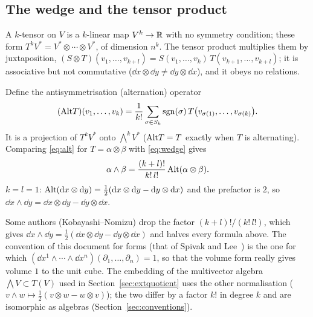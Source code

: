 \subsection{The wedge and the tensor product}\label{sec:wedgetensor}

A $k$-tensor on $V$ is a $k$-linear map $V^k\to\mathbb{R}$ with no symmetry condition; these form $T^kV^*=V^*\otimes\cdots\otimes V^*$, of dimension
$n^k$. The tensor product multiplies them by juxtaposition, $(S\otimes T)(v_1,\dots,v_{k+l})=S(v_1,\dots,v_k)\,T(v_{k+1},\dots,v_{k+l})$;
it is associative but not commutative ($\dd x\otimes\dd y\neq\dd y\otimes\dd x$), and it obeys no relations.

Define the antisymmetrisation (alternation) operator
\begin{equation}\label{eq:alt}
(\Alt T)(v_1,\dots,v_k)=\frac1{k!}\sum_{\sigma\in S_k}\sgn(\sigma)\,T\bigl(v_{\sigma(1)},\dots,v_{\sigma(k)}\bigr).
\end{equation}
It is a projection of $T^kV^*$ onto $\bigwedge^kV^*$ ($\mathrm{Alt} T=T$ exactly when $T$ is alternating). Comparing \eqref{eq:alt} for $T=\alpha\otimes\beta$
with \eqref{eq:wedge} gives
\begin{equation}\label{eq:altwedge}
\alpha\wedge\beta=\frac{(k+l)!}{k!\,l!}\,\Alt(\alpha\otimes\beta).
\end{equation}
\numcheck $k=l=1$: $\mathrm{Alt}(\mathrm{d} x\otimes\mathrm{d} y)=\tfrac12(\mathrm{d} x\otimes\mathrm{d} y-\mathrm{d} y\otimes\mathrm{d} x)$ and the prefactor is $2$, so
$\dd x\wedge\dd y=\dd x\otimes\dd y-\dd y\otimes\dd x$.

\begin{pitfall}[a warning on conventions]
Some authors (\eg Kobayashi--Nomizu) drop the factor $(k+l)!/(k!\,l!)$, which gives $\dd x\wedge\dd y=\tfrac12(\dd x\otimes\dd y-\dd y\otimes\dd x)$ and
halves every formula above. The convention of this document for forms (that of Spivak and Lee~\cite{Spivak,Lee}) is the one for which
$(\dd x^1\wedge\cdots\wedge\dd x^n)(\partial_1,\dots,\partial_n)=1$, so that the volume form really gives volume $1$ to the unit cube.
The embedding of the multivector algebra $\bigwedge V\subset T(V)$ used in Section~\ref{sec:extquotient} uses the other normalisation
($v\wedge w\mapsto\frac12(v\otimes w-w\otimes v)$); the two differ by a factor $k!$ in degree $k$ and are isomorphic as algebras
(Section~\ref{sec:conventions}).
\end{pitfall}


